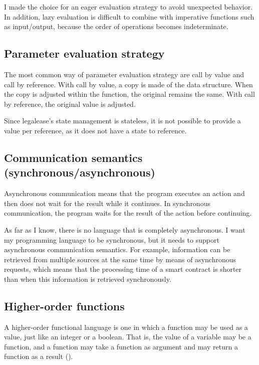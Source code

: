 \documentclass{uva-inf-article}
\begin{document}
\par I made the choice for an eager evaluation strategy to avoid unexpected behavior.
In addition, lazy evaluation is difficult to combine with imperative functions such as 
input/output, because the order of operations becomes indeterminate.

\subsection{Parameter evaluation strategy}
\par The most common way of parameter evaluation strategy are call by value and call by reference. 
With call by value, a copy is made of the data structure. When the copy is adjusted within the function, 
the original remains the same. With call by reference, the original value is adjusted.
\vspace{5mm}

\par Since legalease's state management is stateless, it is not possible to provide a value 
per reference, as it does not have a state to reference.

\subsection{Communication semantics (synchronous/asynchronous)}
\par Asynchronous communication means that the program executes an action and then does not wait for the result while it continues. 
In synchronous communication, the program waits for the result of the action before continuing.
\vspace{5mm}

As far as I know, there is no language that is completely asynchronous. 
I want my programming language to be synchronous, but it needs to support asynchronous communication semantics.
For example, information can be retrieved from multiple sources at the same time by means of asynchronous requests, 
which means that the processing time of a smart contract is shorter than when this information is retrieved synchronously.

\newpage
\subsection{Higher-order functions}
\par A higher-order functional language is one in which a function may be used as a value, 
just like an integer or a boolean. That is, the value of a variable may be a function, 
and a function may take a function as argument and may return a function as a result
(\cite{Sestoft2012}).
\vspace{5mm}
\end{document}

